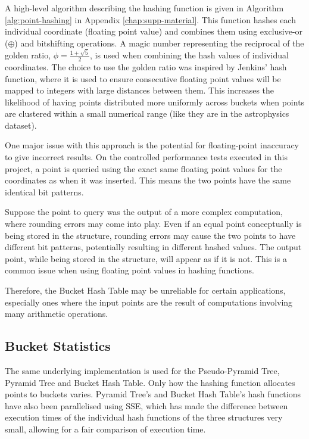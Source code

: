 A high-level algorithm describing the hashing function is given in Algorithm \ref{alg:point-hashing} in Appendix \ref{chap:supp-material}. This function hashes each individual coordinate (floating point value) and combines them using exclusive-or ($\oplus$) and bitshifting operations. A magic number representing the reciprocal of the golden ratio, $\phi = \frac{1 + \sqrt{5}}{2}$, is used when combining the hash values of individual coordinates. The choice to use the golden ratio was inspired by Jenkins' hash function\cite{hash-combine}, where it is used to ensure consecutive floating point values will be mapped to integers with large distances between them. This increases the likelihood of having points distributed more uniformly across buckets when points are clustered within a small numerical range (like they are in the astrophysics dataset).

One major issue with this approach is the potential for floating-point inaccuracy to give incorrect results. On the controlled performance tests executed in this project, a point is queried using the exact same floating point values for the coordinates as when it was inserted. This means the two points have the same identical bit patterns. 

Suppose the point to query was the output of a more complex computation, where rounding errors may come into play. Even if an equal point conceptually is being stored in the structure, rounding errors may cause the two points to have different bit patterns, potentially resulting in different hashed values. The output point, while being stored in the structure, will appear as if it is not. This is a common issue when using floating point values in hashing functions.

Therefore, the Bucket Hash Table may be unreliable for certain applications, especially ones where the input points are the result of computations involving many arithmetic operations.

\subsection{Bucket Statistics}
\label{sec:bucket-stats}

The same underlying implementation is used for the Pseudo-Pyramid Tree, Pyramid Tree and Bucket Hash Table. Only how the hashing function allocates points to buckets varies. Pyramid Tree's and Bucket Hash Table's hash functions have also been parallelised using SSE, which has made the difference between execution times of the individual hash functions of the three structures very small, allowing for a fair comparison of execution time.

